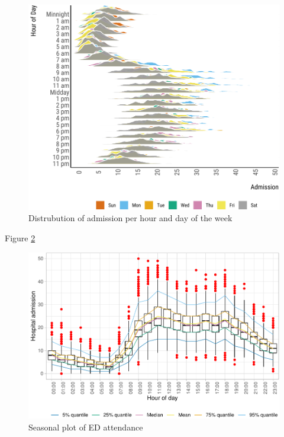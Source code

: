\documentclass[]{elsarticle} %
\begin{document}
\begin{figure}[H]

{\centering \includegraphics{paper_files/figure-latex/hourly-plot-ridge-1} 

}

\caption{Distrubution of admission per hour and day of the week}\label{fig:hourly-plot-ridge}
\end{figure}

Figure \ref{fig:hourly-plot}

\begin{figure}[H]

{\centering \includegraphics[width=0.8\linewidth]{paper_files/figure-latex/hourly-plot-1} 

}

\caption{Seasonal plot of ED attendance}\label{fig:hourly-plot}
\end{figure}
\end{document}
